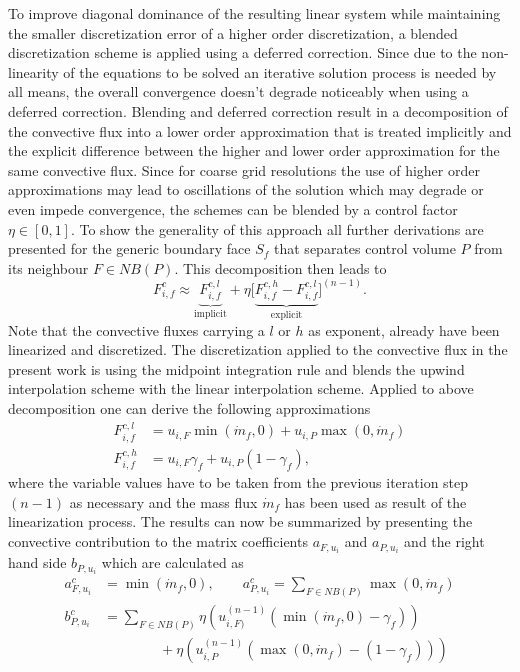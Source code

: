       To improve diagonal dominance of the resulting linear system while maintaining the smaller discretization error of a higher order discretization, a blended discretization scheme is applied using a deferred correction. Since due to the non-linearity of the equations to be solved an iterative solution process is needed by all means, the overall convergence doesn't degrade noticeably when using a deferred correction. Blending and deferred correction result in a decomposition of the convective flux into a lower order approximation that is treated implicitly and the explicit difference between the higher and lower order approximation for the same convective flux. Since for coarse grid resolutions the use of higher order approximations may lead to oscillations of the solution which may degrade or even impede convergence, the schemes can be blended by a control factor \( \eta \in [0,1]\). To show the generality of this approach all further derivations are presented for the generic boundary face \(S_f\) that separates control volume \(P\) from its neighbour \(F \in NB(P)\). This decomposition then leads to
      \begin{displaymath}
        F_{i,f}^c \approx  \underbrace{F_{i,f}^{c,l}}_{\text{implicit}} + \eta \bigl[\underbrace{ F_{i,f}^{c,h} - F_{i,f}^{c,l} }_{\text{explicit}}\bigr]^{(n-1)}.
      \end{displaymath}
      Note that the convective fluxes carrying a \(l\) or \(h\) as exponent, already have been linearized and discretized. The discretization applied to the convective flux in the present work is using the midpoint integration rule and blends the upwind interpolation scheme with the linear interpolation scheme. Applied to above decomposition one can derive the following approximations
      \begin{align*}
        F_{i,f}^{c,l} &= u_{i,F} \min(\dot{m}_f ,0) + u_{i,P} \max(0,\dot{m}_f) \\
        F_{i,f}^{c,h} &= u_{i,F} \gamma_f + u_{i,P} (1 - \gamma_f),
      \end{align*}
      where the variable values have to be taken from the previous iteration step \((n-1)\) as necessary and the mass flux \(\dot{m}_f\) has been used as result of the linearization process. The results can now be summarized by presenting the convective contribution to the matrix coefficients \(a_{F,u_i}\) and \(a_{P,u_i}\) and the right hand side \(b_{P,u_i}\) which are calculated as
      \begin{subequations}
      \begin{align}
        a_{F,u_i}^c &= \min(\dot{m}_f ,0), \quad \quad a_{P,u_i}^c = \sum_{F \in NB(P)} \max(0,\dot{m}_f) \\[1em]
        b_{P,u_i}^c &= \sum_{F \in NB(P)} \eta  \left(u_{i,F)}^{(n-1)} \left( \min(\dot{m}_f,0) - \gamma_f \right)\right) \nonumber \\
                    &\quad \quad \quad  \quad+ \eta \left( u_{i,P}^{(n-1)} \left( \max(0,\dot{m}_f) - \left(1 - \gamma_f\right) \right)\right)
      \end{align}
    \end{subequations}

